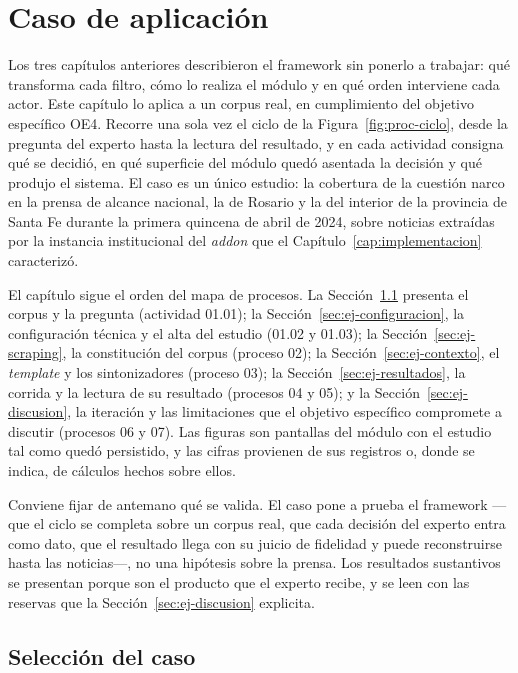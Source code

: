 \documentclass[12pt]{report}
\begin{document}
\chapter{Caso de aplicación}
\label{cap:ejemplo}

Los tres capítulos anteriores describieron el framework sin ponerlo a trabajar: qué transforma cada filtro, cómo lo realiza el módulo y en qué orden interviene cada actor. Este capítulo lo aplica a un corpus real, en cumplimiento del objetivo específico OE4. Recorre una sola vez el ciclo de la Figura~\ref{fig:proc-ciclo}, desde la pregunta del experto hasta la lectura del resultado, y en cada actividad consigna qué se decidió, en qué superficie del módulo quedó asentada la decisión y qué produjo el sistema. El caso es un único estudio: la cobertura de la cuestión narco en la prensa de alcance nacional, la de Rosario y la del interior de la provincia de Santa Fe durante la primera quincena de abril de 2024, sobre noticias extraídas por la instancia institucional del \textit{addon} que el Capítulo~\ref{cap:implementacion} caracterizó.

El capítulo sigue el orden del mapa de procesos. La Sección~\ref{sec:ej-caso} presenta el corpus y la pregunta (actividad 01.01); la Sección~\ref{sec:ej-configuracion}, la configuración técnica y el alta del estudio (01.02 y 01.03); la Sección~\ref{sec:ej-scraping}, la constitución del corpus (proceso 02); la Sección~\ref{sec:ej-contexto}, el \textit{template} y los sintonizadores (proceso 03); la Sección~\ref{sec:ej-resultados}, la corrida y la lectura de su resultado (procesos 04 y 05); y la Sección~\ref{sec:ej-discusion}, la iteración y las limitaciones que el objetivo específico compromete a discutir (procesos 06 y 07). Las figuras son pantallas del módulo con el estudio tal como quedó persistido, y las cifras provienen de sus registros o, donde se indica, de cálculos hechos sobre ellos.

Conviene fijar de antemano qué se valida. El caso pone a prueba el framework ---que el ciclo se completa sobre un corpus real, que cada decisión del experto entra como dato, que el resultado llega con su juicio de fidelidad y puede reconstruirse hasta las noticias---, no una hipótesis sobre la prensa. Los resultados sustantivos se presentan porque son el producto que el experto recibe, y se leen con las reservas que la Sección~\ref{sec:ej-discusion} explicita.

\section{Selección del caso}
\label{sec:ej-caso}
\end{document}
